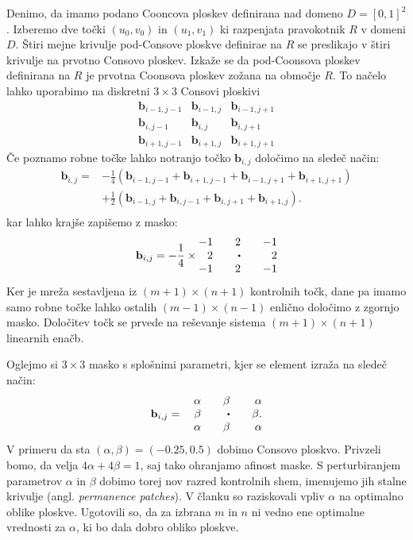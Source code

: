 \documentclass[a4paper,12pt]{article}
\begin{document}
Denimo, da imamo podano Cooncova ploskev definirana nad domeno $D = [0,1]^2$. 
Izberemo dve točki $(u_0,v_0)$ in $(u_1,v_1)$ ki razpenjata pravokotnik $R$ v domeni $D$. 
Štiri mejne krivulje pod-Consove ploskve definirae na $R$ se preslikajo 
v štiri krivulje na prvotno Consovo ploskev. Izkaže se da pod-Coonsova ploskev 
definirana na $R$ je prvotna Coonsova ploskev zožana na območje $R$. To načelo 
lahko uporabimo na diskretni $3 \times 3$ Consovi ploskivi
$$
\begin{matrix} 
   \mathbf{b}_{i-1,j-1} & \mathbf{b}_{i-1,j} & \mathbf{b}_{i-1,j+1}\\
   \mathbf{b}_{i,j-1} & \mathbf{b}_{i,j} & \mathbf{b}_{i,j+1}\\
   \mathbf{b}_{i+1,j-1} & \mathbf{b}_{i+1,j} & \mathbf{b}_{i+1,j+1}
\end{matrix}
$$ 
Če poznamo robne točke lahko notranjo točko $\mathbf{b}_{i,j}$ določimo na sledeč način: 
\begin{align*}
   \mathbf{b}_{i,j} =& -\frac{1}{4}(\mathbf{b}_{i-1,j-1} + \mathbf{b}_{i+1,j-1} +
      \mathbf{b}_{i-1,j+1} + \mathbf{b}_{i+1,j+1}) \\
      &+\frac{1}{2}(\mathbf{b}_{i-1,j} + \mathbf{b}_{i,j-1}+
      \mathbf{b}_{i,j+1} + \mathbf{b}_{i+1,j}).\\
\end{align*}
kar lahko krajše zapišemo z masko: 
$$
\mathbf{b}_{i,j} = -\frac{1}{4} \times 
\begin{matrix*}[r]
-1 && 2 && -1 \\
2 && \sbullet && 2\\
-1 && 2 && -1
\end{matrix*}
$$
Ker je mreža sestavljena iz $(m+1)\times(n+1)$ kontrolnih točk, dane pa imamo samo robne
točke lahko ostalih $(m-1)\times(n-1)$ enlično določimo z zgornjo masko. Določitev točk se prvede
na reševanje sistema $(m+1)\times(n+1)$ linearnih enačb.

Oglejmo si $3 \times 3$ masko s splošnimi parametri, kjer se element izraža na sledeč način:
$$
\mathbf{b}_{i,j} =  \quad 
\begin{matrix*}[r]
\alpha && \beta && \alpha \\
\beta && \sbullet && \beta. \\
\alpha && \beta && \alpha
\end{matrix*}
$$
V primeru da sta $(\alpha, \beta) = (-0.25, 0.5)$ dobimo Consovo
ploskvo. Privzeli bomo, da velja $4\alpha + 4\beta = 1$, saj 
tako ohranjamo afinost maske. S perturbiranjem parametrov 
$\alpha$ in $\beta$ dobimo torej nov razred kontrolnih shem, imenujemo jih stalne 
krivulje (angl. \textit{permanence patches}). V članku \cite{DCP}  so raziskovali
vpliv $\alpha$ na optimalno oblike ploskve. Ugotovili so, da za izbrana $m$ in $n$
ni vedno ene optimalne vrednosti za $\alpha$, ki bo dala dobro obliko ploskve.
\end{document}
